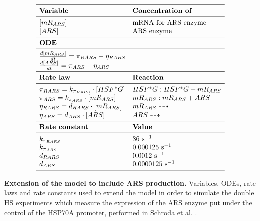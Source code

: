 \documentclass[oneside, 10pt, a4paper, twocolumn]{article}
\begin{document}
\bgroup
\def\arraystretch{1.5}%
\begin{table}[h!]
\[\begin{array}{ll}
\toprule
  \text{\textbf{Variable}}                     & \text{\textbf{Concentration of}} \\
\midrule
  \left[mR_{ARS}\right]                        & \text{mRNA for ARS enzyme}          \\
  \left[ARS\right]                             & \text{ARS enzyme}                \\
\midrule
  \text{\textbf{ODE}}                         & \text{ }                         \\
\midrule
 \frac{d\left[mR_{ARS}\right]}{dt} = \pi_{RARS} - \eta_{RARS} & \text{ }          \\
 \frac{d\left[ARS\right]}{dt} = \pi_{ARS} - \eta_{ARS} & \text{ }                  \\
 \midrule
  \text{\textbf{Rate law}}                     & \text{\textbf{Reaction}}         \\
\midrule
  \pi_{RARS}  = k_{\pi_{RARS}} \cdot [HSF^*G]  & HSF^*G: HSF^*G + mR_{ARS}            \\
  \pi_{ARS}   = k_{\pi_{ARS}} \cdot [mR_{ARS}] & mR_{ARS}: mR_{ARS} + ARS           \\
  \eta_{RARS} = d_{{RARS}} \cdot [mR_{ARS}]    & mR_{ARS} \dashrightarrow         \\
  \eta_{ARS}  = d_{{ARS}} \cdot [ARS]          & ARS \dashrightarrow              \\
\midrule
 \text{\textbf{Rate constant}}                 & \text{\textbf{Value}}            \\
\midrule
    k_{\pi_{RARS}}                             & 36 \text{ s}^{-1}                \\
    k_{\pi_{ARS}}                              & 0.000125 \text{ s}^{-1}          \\
    d_{RARS}                                   & 0.0012 \text{ s}^{-1}            \\
    d_{ARS}                                    & 0.0000125 \text{ s}^{-1}         \\
\bottomrule
\end{array}\]
\caption{\textbf{Extension of the model to include ARS production.} Variables, ODEs, rate laws and rate constants used to extend the model in order to simulate the double HS experiments which measure the expression of the ARS enzyme put under the control of the HSP70A promoter, performed in Schroda et al. \cite{Schroda2000}.}\label{TabARS}
\end{table}
\egroup
\end{document}
